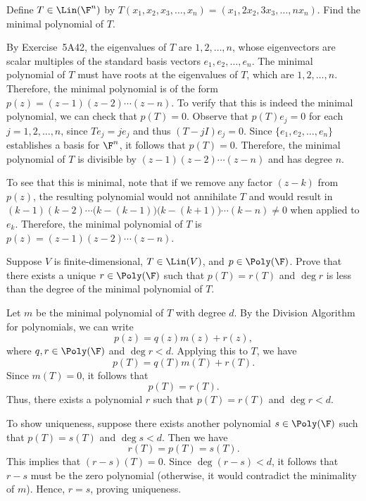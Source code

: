 \begin{exercise}
Define $T\in\Lin(\F^n)$ by
$T(x_1,x_2,x_3,\dots,x_n)=(x_1,2x_2,3x_3,\dots,nx_n)$. Find the minimal
polynomial of $T$.
\end{exercise}
\begin{solution}
By Exercise~5A42, the eigenvalues of $T$ are $1,2,\dots,n$, whose eigenvectors
are scalar multiples of the standard basis vectors $e_1,e_2,\dots,e_n$. The
minimal polynomial of $T$ must have roots at the eigenvalues of $T$, which are
$1,2,\dots,n$. Therefore, the minimal polynomial is of the form
$p(z)=(z-1)(z-2)\cdots(z-n)$. To verify that this is indeed the minimal
polynomial, we can check that $p(T)=0$. Observe that $p(T)e_j=0$ for each
$j=1,2,\dots,n$, since $Te_j=je_j$ and thus $(T-jI)e_j=0$. Since
$\{e_1,e_2,\dots,e_n\}$ establishes a basis for $\F^n$, it follows that
$p(T)=0$. Therefore, the minimal polynomial of $T$ is divisible by
$(z-1)(z-2)\cdots(z-n)$ and has degree $n$.

To see that this is minimal, note that if we remove any factor $(z-k)$ from
$p(z)$, the resulting polynomial would not annihilate $T$ and would result in
$(k-1)(k-2)\cdots\bigl(k-(k-1)\bigr)\bigl(k-(k+1)\bigr)\cdots(k-n)\ne0$ when
applied to $e_k$. Therefore, the minimal polynomial of $T$ is
$p(z)=(z-1)(z-2)\cdots(z-n)$.
\end{solution}

\begin{exercise}
Suppose $V$ is finite-dimensional, $T\in\Lin(V)$, and $p\in\Poly(\F)$. Prove
that there exists a unique $r\in\Poly(\F)$ such that $p(T)=r(T)$ and $\deg r$
is less than the degree of the minimal polynomial of $T$.
\end{exercise}
\begin{solution}
Let $m$ be the minimal polynomial of $T$ with degree $d$. By the Division
Algorithm for polynomials, we can write
\[ p(z)=q(z)m(z)+r(z), \]
where $q,r\in\Poly(\F)$ and $\deg r<d$. Applying this to $T$, we have
\[ p(T)=q(T)m(T)+r(T). \]
Since $m(T)=0$, it follows that
\[ p(T)=r(T). \]
Thus, there exists a polynomial $r$ such that $p(T)=r(T)$ and $\deg r<d$.

To show uniqueness, suppose there exists another polynomial $s\in\Poly(\F)$
such that $p(T)=s(T)$ and $\deg s<d$. Then we have
\[ r(T)=p(T)=s(T). \]
This implies that $(r-s)(T)=0$. Since $\deg(r-s)<d$, it follows that $r-s$
must be the zero polynomial (otherwise, it would contradict the minimality of
$m$). Hence, $r=s$, proving uniqueness.
\end{solution}

